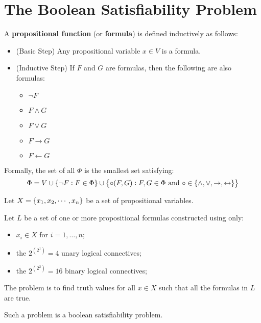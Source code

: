 \section{The Boolean Satisfiability Problem}
\begin{tcolorbox}[colframe=defcolor,title={\color{white}\bf Propositional Function (Formula)}]
\begin{definition}
A \textbf{propositional function} (or \textbf{formula}) is defined inductively as follows:
\begin{itemize}
	\item[] (Basic Step) Any propositional variable $x\in V$ is a formula.
	\item[] (Inductive Step) If $F$ and $G$ are formulas, then the following are also formulas:
	\begin{itemize}
		\item $\lnot F$
		\item $F\land G$
		\item $F\lor G$
		\item $F\rightarrow G$
		\item $F\leftarrow G$
	\end{itemize}
\end{itemize}
Formally, the set of all $\Phi$ is the smallest set satisfying: \[
\Phi = V\cup\set{\lnot F:F\in\Phi}\cup\set{\circ(F,G):F,G\in\Phi\ \text{and}\ \circ\in\set{\land,\lor,\rightarrow,\leftrightarrow}}
\]
\end{definition}
\end{tcolorbox}

\begin{tcolorbox}[colframe=defcolor,title={\color{white}\bf Boolean Satisfiability Problem (SAT)}]
\begin{definition}
Let $X=\set{x_1,x_2,\cdots, x_n}$ be a set of propositional variables.

Let $L$ be a set of one or more propositional formulas constructed using only:
\begin{itemize}
	\item $x_i\in X$ for $i=1,\dots,n$;
	\item the $2^{(2^1)}=4$ unary logical connectives;
	\item the $2^{(2^2)}=16$ binary logical connectives;
\end{itemize}
The problem is to find truth values for all $x\in X$
such that all the formulas in $L$ are true.

Such a problem is a boolean satisfiability problem.
\end{definition}
\end{tcolorbox}

